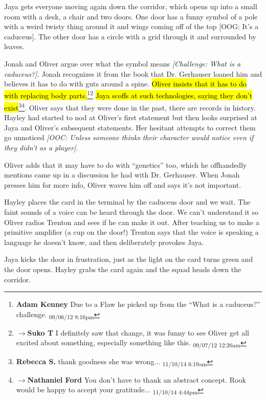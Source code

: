 Jaya gets everyone moving again down the corridor, which opens up into a small room with a desk, a chair and two doors.  One door has a funny symbol of a pole with a weird twisty thing around it and wings coming off of the top {[}OOG: It's a caduceus{]}.  The other door has a circle with a grid through it and surrounded by leaves.



Jonah and Oliver argue over what the symbol means \textit{{[}Challenge: What is a caduceus?{]}.}  Jonah recognizes it from the book that Dr. Gerhauser loaned him and believes it has to do with guts around a spine.  \hl{Oliver insists that it has to do with replacing body parts.}\footnote{\textbf{Adam Kenney }Due to a Flaw he picked up from the ``What is a caduceus?'' challenge. \textsubscript{09/06/12 8:16pm}}\footnote{$\rightarrow$\textbf{Suko T }I definitely saw that change, it was funny to see Oliver get all excited about something, especially something like this. \textsubscript{09/07/12 12:26am}}  \hl{Jaya scoffs at such technologies, saying they don't exist}\footnote{\textbf{Rebecca S. }thank goodness she was wrong... \textsubscript{11/10/14 6:19am}}\footnote{$\rightarrow$\textbf{Nathaniel Ford }You don't have to thank an abstract concept. Rook would be happy to accept your gratitude... \textsubscript{11/10/14 4:44pm}}.  Oliver says that they were done in the past, there are records in history.  Hayley had started to nod at Oliver's first statement but then looks surprised at Jaya and Oliver's subsequent statements.  Her hesitant attempts to correct them go unnoticed \textit{{[}OOC: Unless someone thinks their character would notice even if they didn't as a player{]}}.



Oliver adds that it may have to do with ``genetics'' too, which he offhandedly mentions came up in a discussion he had with Dr. Gerhauser.  When Jonah presses him for more info, Oliver waves him off and says it's not important.



Hayley places the card in the terminal by the caduceus door and we wait.  The faint sounds of a voice can be heard through the door.  We can't understand it so Oliver radios Trenton and sees if he can make it out.  After teaching us to make a primitive amplifier (a cup on the door!) Trenton says that the voice is speaking a language he doesn't know, and then deliberately provokes Jaya.



Jaya kicks the door in frustration, just as the light on the card turns green and the door opens.  Hayley grabs the card again and the squad heads down the corridor.



